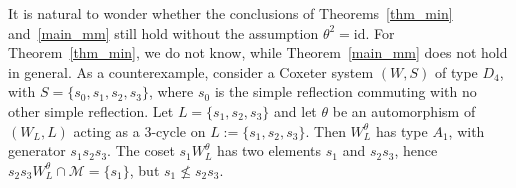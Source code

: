 \documentclass[ALCO, Unicode]{cedram}
\newcommand{\M}{{\mathcal{M}}}
\begin{document}
\begin{rema}
	It is natural to wonder whether the conclusions of Theorems~\ref{thm_min} and~\ref{main_mm} still hold without the assumption $\theta^2=\mathrm{id}$. For Theorem~\ref{thm_min}, we do not know, while Theorem~\ref{main_mm} does not hold in general. As a counterexample, consider a Coxeter system $(W,S)$ of type $D_4$, with $S=\{s_0, s_1, s_2, s_3\}$, where $s_0$ is the simple reflection commuting with no other simple reflection. Let $L=\{s_1, s_2, s_3\}$ and let $\theta$ be an automorphism of $(W_L, L)$ acting as a $3$-cycle on $L:=\{s_1, s_2, s_3\}$. Then $W_L^\theta$ has type $A_1$, with generator $s_1 s_2 s_3$. The coset $s_1 W_L^\theta$ has two elements $s_1$ and $s_2 s_3$, hence $s_2 s_3 W_L^\theta \cap \M=\{s_1\}$, but $s_1 \not\leq s_2 s_3$. 
\end{rema}




\end{document}

